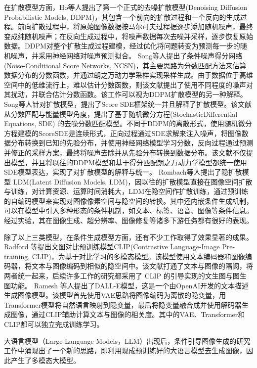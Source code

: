 \par
在扩散模型方面，Ho\cite{ho2020denoising}等人提出了第一个正式的去噪扩散模型(Denoising Diffusion Probabilistic Models, DDPM)，其包含一个前向的扩散过程和一个反向的生成过程。前向扩散过程中，将原始图像数据按马尔可夫过程据逐步添加随机噪声，最终变成纯随机噪声；在反向生成过程中，将噪声数据每次去噪并采样，逐步恢复原始数据。DDPM对整个扩散生成过程建模，经过优化将问题转变为预测每一步的随机噪声，并采用神经网络对噪声预测拟合。
Song\cite{songGenerativeModelingEstimating2019}等人提出了条件噪声得分网络(Noise-Conditional Score Networks, NCSN)，其主要思路为分数匹配方法来估算数据分布的分数函数，并通过朗之万动力学采样实现采样生成。由于数据位于高维空间中的低维流行上，难以估计分数函数，则该文献提出了使用不同程度的噪声对其扰动，并联合估计分数函数。该工作可以视为DDPM扩散模型的另一种解释。
Song\cite{song2020score}等人针对扩散模型，提出了Score SDE框架统一并且解释了扩散模型。该文献从分数匹配与能量模型角度，提出了基于随机微分方程(StochasticDifferential Equations, SDE) 的去噪分数匹配模型。不同于DDPM的离散形式，使用随机微分方程建模的ScoreSDE是连续形式，正向过程通过SDE求解来注入噪声，将图像数据分布转换到已知的先验分布，并使用神经网络模型学习分数，反向过程通过预测并修正的采样方案，最终将噪声去除并从先验分布转换到数据分布。该文献不仅提出模型，并且将以往的DDPM模型和基于得分匹配朗之万动力学模型都统一使用SDE模型表达，实现了对扩散模型的解释与统一。
Rombach\cite{rombach2022high}等人提出了隐扩散模型 LDM(Latent Diffusion Models, LDM)，因以往的扩散模型直接在图像空间扩散与训练，对计算资源、运算时间消耗大，LDM在隐空间作扩散训练，通过预训练的自编码模型来实现对图像像素空间与隐空间的转换。其中还内嵌条件生成机制，可以在模型中引入多种形态的条件机制，如文本、标签、语音、图像等条件信息。经过实验，其在图像生成、超分辨率、图像修复等诸多下游任务都有很好的表现。
\par
除了以上三类模型，在条件生成模型方面，还有不少工作取得了效果显著的成果。Radford \cite{pmlr-v139-radford21a}等提出文图对比预训练模型CLIP(Contrastive Language-Image Pre-training, CLIP)，为基于对比学习的多模态模型。该模型使用文本编码器和图像编码器，将文本与图像编码到相似的隐空间中。该文献打通了文本与图像的隔阂，将两者统一起来，后续许多工作的研究都采用了 CLIP 的引导实现的文生图与图生图功能。
Ramesh \cite{pmlr-v139-ramesh21a}等人提出了DALL-E模型，这是一个由OpenAI开发的文本描述生成图像模型。该模型首先使用VAE思路将图像编码为离散的隐变量，用Transformer模型将自然语言映射到隐变量，最后将隐变量融合成并使用解码器生成图像，通过CLIP辅助计算文本与图像的相关度。其中的VAE、Transformer和CLIP都可以独立完成训练学习。
\par
大语言模型（Large Language Models，LLM）出现后，条件引导图像生成的研究工作中涌现出了一个新的思路，即利用现成预训练好的大语言模型去生成图像，因此产生了多模态大模型\cite{zhang2024mmllmsrecentadvancesmultimodal}。
